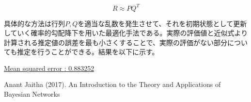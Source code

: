 \documentclass[a4j,12pt]{jarticle}
\begin{document}
$$ R \approx P  Q^T$$

具体的な方法は行列$P,Q$を適当な乱数を発生させて、それを初期状態として更新していく確率的勾配降下を用いた最適化手法である。実際の評価値と近似式より計算される推定値の誤差を最も小さくすることで、実際の評価がない部分についても推定を行うことができる。結果を以下に示す。

\cite{Jアルバート} \cite{Friedman} \cite{Nagarajan}

\underline{Mean squared error :  0.883252}


\begin{thebibliography}{5}
\bibitem{}  Anant Jaitha (2017). An Introduction to the Theory and Applications of Bayesian Networks 
\end{thebibliography}



\end{document}
